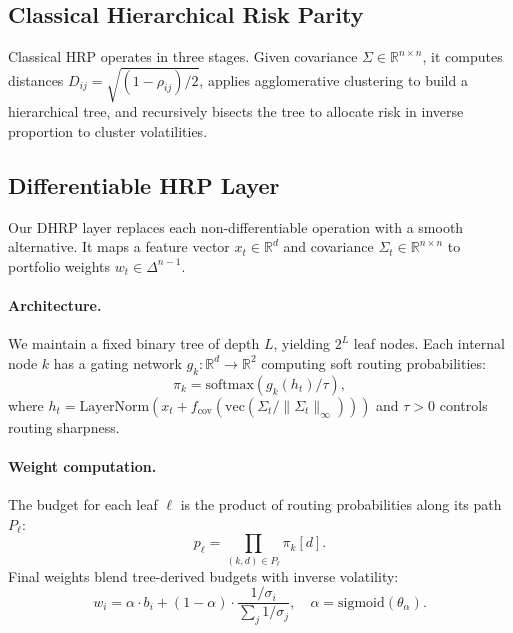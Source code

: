 \documentclass{article}
\begin{document}
\subsection{Classical Hierarchical Risk Parity}

Classical HRP operates in three stages. Given covariance $\Sigma \in \mathbb{R}^{n \times n}$, it computes distances $D_{ij} = \sqrt{(1 - \rho_{ij})/2}$, applies agglomerative clustering to build a hierarchical tree, and recursively bisects the tree to allocate risk in inverse proportion to cluster volatilities.

\subsection{Differentiable HRP Layer}

Our DHRP layer replaces each non-differentiable operation with a smooth alternative. It maps a feature vector $x_t \in \mathbb{R}^d$ and covariance $\Sigma_t \in \mathbb{R}^{n \times n}$ to portfolio weights $w_t \in \Delta^{n-1}$.

\paragraph{Architecture.} We maintain a fixed binary tree of depth $L$, yielding $2^L$ leaf nodes. Each internal node $k$ has a gating network $g_k: \mathbb{R}^d \to \mathbb{R}^2$ computing soft routing probabilities:
\begin{equation}
\pi_k = \text{softmax}(g_k(h_t) / \tau),
\end{equation}
where $h_t = \text{LayerNorm}(x_t + f_{\text{cov}}(\text{vec}(\Sigma_t / \|\Sigma_t\|_\infty)))$ and $\tau > 0$ controls routing sharpness.

\paragraph{Weight computation.} The budget for each leaf $\ell$ is the product of routing probabilities along its path $P_\ell$:
\begin{equation}
p_\ell = \prod_{(k, d) \in P_\ell} \pi_k[d].
\end{equation}
Final weights blend tree-derived budgets with inverse volatility:
\begin{equation}
w_i = \alpha \cdot b_i + (1 - \alpha) \cdot \frac{1/\sigma_i}{\sum_j 1/\sigma_j}, \quad \alpha = \text{sigmoid}(\theta_\alpha).
\end{equation}
\end{document}
